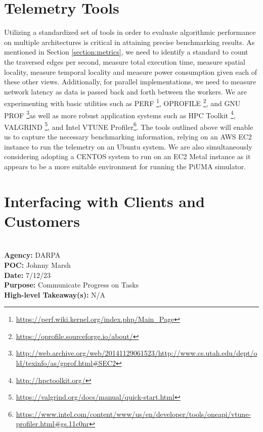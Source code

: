 \documentclass[letterpaper, 10pt]{article}
\begin{document}
\begin{multicols}{2}
{    \section{Telemetry Tools}\label{section:telemetry}
        Utilizing a standardized set of tools in order to evaluate algorithmic performance on multiple architectures is critical in attaining precise benchmarking results. As mentioned in Section \ref{section:metrics}, we need to identify a standard to count the traversed edges per second, measure total execution time, measure spatial locality, measure temporal locality and measure power consumption given each of these other views. Additionally, for parallel implementations, we need to measure network latency as data is passed back and forth between the workers. We are experimenting with basic utilities such as PERF \footnote{\href{https://perf.wiki.kernel.org/index.php/Main_Page}{https://perf.wiki.kernel.org/index.php/Main_Page}}, OPROFILE \footnote{\href{https://oprofile.sourceforge.io/about/}{https://oprofile.sourceforge.io/about/}}, and GNU PROF \footnote{\href{http://web.archive.org/web/20141129061523/http://www.cs.utah.edu/dept/old/texinfo/as/gprof.html#SEC2}{http://web.archive.org/web/20141129061523/http://www.cs.utah.edu/dept/old/texinfo/as/gprof.html#SEC2}}as well as more robust application systems such as HPC Toolkit \footnote{\href{http://hpctoolkit.org/}{http://hpctoolkit.org/}}, VALGRIND \footnote{\href{https://valgrind.org/docs/manual/quick-start.html}{https://valgrind.org/docs/manual/quick-start.html}}, and Intel VTUNE Profiler\footnote{\href{https://www.intel.com/content/www/us/en/developer/tools/oneapi/vtune-profiler.html#gs.11c0nr}{https://www.intel.com/content/www/us/en/developer/tools/oneapi/vtune-profiler.html#gs.11c0nr}}. The tools outlined above will enable us to capture the necessary benchmarking information, relying on an AWS EC2 instance to run the telemetry on an Ubuntu system. We are also simultaneously considering adopting a CENTOS system to run on an EC2 Metal instance as it appears to be a more suitable environment for running the PiUMA simulator. \\
       
    \section{Interfacing with Clients and Customers}\label{section:stakeholders}        
        \\
        \textbf{Agency:} DARPA\\  
        \textbf{POC:} Johnny Marsh \\
        \textbf{Date:} 7/12/23 \\
        \textbf{Purpose:} Communicate Progress on Tasks \\
        \textbf{High-level Takeaway(s):} N/A \\ 

}
\end{multicols}
\end{document}

